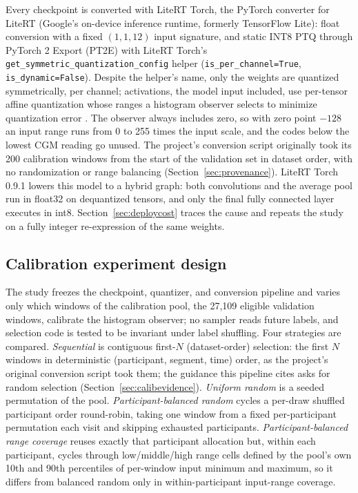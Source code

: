 \documentclass[10pt,twocolumn]{article}
\begin{document}
Every checkpoint is converted with LiteRT Torch, the PyTorch converter for
LiteRT (Google's on-device inference runtime, formerly TensorFlow Lite):
float conversion with a fixed $(1,1,12)$ input signature, and static INT8
PTQ through PyTorch 2 Export (PT2E) with LiteRT Torch's
\texttt{get\_symmetric\_quantization\_config} helper
(\texttt{is\_per\_channel=True}, \texttt{is\_dynamic=False}). Despite the
helper's name, only the weights are quantized symmetrically, per channel;
activations, the model input included, use per-tensor affine quantization
whose ranges a histogram observer selects to minimize quantization error
\cite{pytorchPT2E2026}. The observer always includes zero, so with zero
point $-128$ an input range runs from 0 to 255 times the input scale, and
the codes below the lowest CGM reading go unused. The project's conversion
script originally took its 200 calibration windows from the start of the
validation set in dataset order, with no randomization or range balancing
(Section~\ref{sec:provenance}). LiteRT Torch 0.9.1 lowers this model to
a hybrid graph: both convolutions and the average pool run in float32 on
dequantized tensors, and only the final fully connected layer executes in
int8. Section~\ref{sec:deploycost} traces the cause and repeats the study
on a fully integer re-expression of the same weights.

\subsection{Calibration experiment design}
\label{sec:design}

The study freezes the checkpoint, quantizer, and conversion pipeline and
varies only which windows of the calibration pool, the 27,109 eligible
validation windows, calibrate the histogram observer; no sampler reads
future labels, and selection code is tested to be invariant under label
shuffling. Four strategies are compared. \emph{Sequential} is contiguous
first-$N$ (dataset-order) selection: the first $N$ windows in deterministic
(participant, segment, time) order, as the project's original conversion
script took them; the guidance this pipeline cites asks for random
selection (Section~\ref{sec:calibevidence}). \emph{Uniform random} is a seeded
permutation of the pool. \emph{Participant-balanced random} cycles a
per-draw shuffled participant order round-robin, taking one window from a
fixed per-participant permutation each visit and skipping exhausted
participants. \emph{Participant-balanced range coverage} reuses exactly
that participant allocation but, within each participant, cycles through
low/middle/high range cells defined by the pool's own 10th and 90th
percentiles of per-window input minimum and maximum, so it differs from
balanced random only in within-participant input-range coverage.
\end{document}
